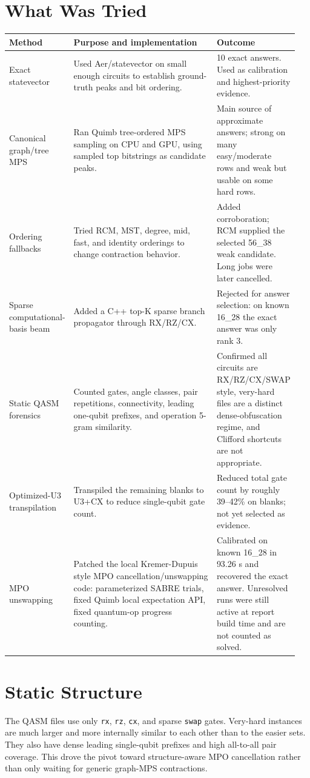 \documentclass[10pt]{article}
\begin{document}
\section*{What Was Tried}
\begin{longtable}{p{0.22\linewidth} p{0.51\linewidth} p{0.22\linewidth}}
\toprule
Method & Purpose and implementation & Outcome \\
\midrule
Exact statevector & Used Aer/statevector on small enough circuits to establish ground-truth peaks and bit ordering. & 10 exact answers. Used as calibration and highest-priority evidence. \\
Canonical graph/tree MPS & Ran Quimb tree-ordered MPS sampling on CPU and GPU, using sampled top bitstrings as candidate peaks. & Main source of approximate answers; strong on many easy/moderate rows and weak but usable on some hard rows. \\
Ordering fallbacks & Tried RCM, MST, degree, mid, fast, and identity orderings to change contraction behavior. & Added corroboration; RCM supplied the selected 56\_38 weak candidate. Long jobs were later cancelled. \\
Sparse computational-basis beam & Added a C++ top-K sparse branch propagator through RX/RZ/CX. & Rejected for answer selection: on known 16\_28 the exact answer was only rank 3. \\
Static QASM forensics & Counted gates, angle classes, pair repetitions, connectivity, leading one-qubit prefixes, and operation 5-gram similarity. & Confirmed all circuits are RX/RZ/CX/SWAP style, very-hard files are a distinct dense-obfuscation regime, and Clifford shortcuts are not appropriate. \\
Optimized-U3 transpilation & Transpiled the remaining blanks to U3+CX to reduce single-qubit gate count. & Reduced total gate count by roughly 39--42\% on blanks; not yet selected as evidence. \\
MPO unswapping & Patched the local Kremer-Dupuis style MPO cancellation/unswapping code: parameterized SABRE trials, fixed Quimb local expectation API, fixed quantum-op progress counting. & Calibrated on known 16\_28 in 93.26 s and recovered the exact answer. Unresolved runs were still active at report build time and are not counted as solved. \\
\bottomrule
\end{longtable}

\section*{Static Structure}
The QASM files use only \texttt{rx}, \texttt{rz}, \texttt{cx}, and sparse \texttt{swap} gates. Very-hard instances are
much larger and more internally similar to each other than to the easier sets. They also have dense leading single-qubit
prefixes and high all-to-all pair coverage. This drove the pivot toward structure-aware MPO cancellation rather than only
waiting for generic graph-MPS contractions.
\end{document}
